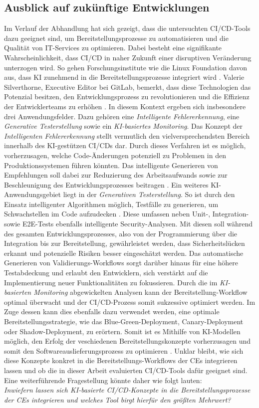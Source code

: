 \subsection{Ausblick auf zukünftige Entwicklungen}

Im Verlauf der Abhandlung hat sich gezeigt, dass die untersuchten CI/CD-Tools  dazu geeignet sind, um Bereitstellungsprozesse zu automatisieren und die Qualität von IT-Services zu optimieren. Dabei besteht eine signifikante Wahrscheinlichkeit, dass CI/CD in naher Zukunft einer disruptiven Veränderung unterzogen wird. So gehen Forschungsinstitute wie die Linux Foundation davon aus, dass KI zunehmend in die Bereitstellungsprozesse integriert wird \cite{Foundation.2022}. Valerie Silverthorne, Executive Editor bei GitLab, bemerkt, dass diese Technologien das Potenzial besitzen, den Entwicklungsprozess zu revolutionieren und die Effizienz der Entwicklerteams zu erhöhen \cite{.20230415}. In diesem Kontext ergeben sich insbesondere drei Anwendungsfelder. Dazu gehören eine \textit{Intelligente Fehlererkennung}, eine \textit{Generative Testerstellung} sowie ein \textit{KI-basiertes Monitoring}. Das Konzept der \textit{Intelligenten Fehlererkennung} stellt vermutlich den vielversprechendsten Bereich innerhalb des KI-gestützen CI/CDs dar. Durch dieses Verfahren ist es möglich, vorherzusagen, welche Code-Änderungen potenziell zu Problemen in den Produktionssystemen führen könnten. Das intelligente Generieren von Empfehlungen soll dabei zur Reduzierung des Arbeitsaufwands sowie zur Beschleunigung des Entwicklungsprozesses beitragen \cite{.20230419d}. Ein weiteres KI-Anwendungsgebiet liegt in der \textit{Generativen Testerstellung}. So ist durch den Einsatz intelligenter Algorithmen möglich, Testfälle zu generieren, um Schwachstellen im Code aufzudecken \cite{Fernandes.20210223}. Diese umfassen neben Unit-, Integration- sowie E2E-Tests ebenfalls intelligente Security-Analysen. Mit diesen soll  während des gesamten Entwicklungsprozesses, also von der Programmierung über die Integration bis zur Bereitstellung, gewährleistet werden, dass Sicherheitslücken erkannt und potenzielle Risiken besser eingeschätzt werden. Das automatische Generieren von Validierungs-Workflows sorgt darüber hinaus für eine höhere Testabdeckung und erlaubt den Entwicklern, sich verstärkt auf die Implementierung neuer Funktionalitäten zu fokussieren. Durch die im \textit{KI-basierten Monitoring} abgewickelten Analysen kann der Bereitstellung-Workflow optimal überwacht und der CI/CD-Prozess somit sukzessive optimiert werden. Im Zuge dessen kann dies ebenfalls dazu verwendet werden, eine optimale Bereitstellungsstrategie, wie das Blue-Green-Deployment, Canary-Deployment oder Shadow-Deployment, zu erörtern. Somit ist es Mithilfe von KI-Modellen möglich, den Erfolg der veschiedenen Bereitstellungskonzepte vorherzusagen und somit den Softwareauslieferungsprozess zu optimieren \cite{.20230419e}. Unklar bleibt, wie sich diese Konzepte konkret in die Bereitstellungs-Workflows der CEs integrieren lassen und ob die in dieser Arbeit evaluierten CI/CD-Tools dafür geeignet sind. Eine weiterführende Fragestellung könnte daher wie folgt lauten:\\
\textit{Inwiefern lassen sich KI-basierte CI/CD-Konzepte in die Bereitstellungsprozesse der CEs integrieren und welches Tool birgt hierfür den größten Mehrwert?}
